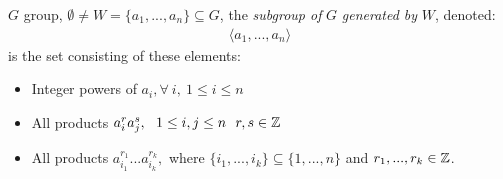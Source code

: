 \begin{definition}
$G$ group, $\emptyset\neq W=\{a_1,...,a_n\}\subseteq G$, the \textit{subgroup of} $G$ \textit{generated by} $W$, denoted:
\begin{align}
    \langle a_1,...,a_n \rangle \nonumber
\end{align}
is the set consisting of these elements:
\begin{itemize}
    \item Integer powers of $a_i, \forall \ i, \ 1\leq i \leq n$ 
    \item All products $a_i^r a_j^s, \ \ 1\leq i,j \leq n \ \ r,s\in {\mathbb{ Z}}$
    \item All products $a_{i_1}^{r_1} ... a_{i_k}^{r_k}, $ where $\{i_1,...,i_k\}\subseteq \{1,...,n\}$ and $r_1,...,r_k\in {\mathbb{ Z}}$.
\end{itemize}

\end{definition}
%
